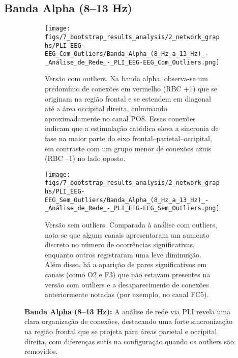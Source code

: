 \subsection{Banda Alpha (8–13 Hz)}
\begin{figure}[H]
    \centering
    \begin{subfigure}[b]{0.48\textwidth}
        \texttt{[image: figs/7\_bootstrap\_results\_analysis/2\_network\_graphs/PLI\_EEG-EEG\_Com\_Outliers/Banda\_Alpha\_(8\_Hz\_a\_13\_Hz)\_-\_Análise\_de\_Rede\_-\_PLI\_EEG-EEG\_Com\_Outliers.png]}
        \caption{\small Versão com outliers. Na banda alpha, observa-se um predomínio de conexões em vermelho (RBC +1) que se originam na região frontal e se estendem em diagonal até a área occipital direita, culminando aproximadamente no canal PO8. Essas conexões indicam que a estimulação catódica eleva a sincronia de fase na maior parte do eixo frontal–parietal–occipital, em contraste com um grupo menor de conexões azuis (RBC –1) no lado oposto.}
    \end{subfigure} 
    \hfill
    \begin{subfigure}[b]{0.48\textwidth}
        \texttt{[image: figs/7\_bootstrap\_results\_analysis/2\_network\_graphs/PLI\_EEG-EEG\_Sem\_Outliers/Banda\_Alpha\_(8\_Hz\_a\_13\_Hz)\_-\_Análise\_de\_Rede\_-\_PLI\_EEG-EEG\_Sem\_Outliers.png]}
        \caption{\small Versão sem outliers. Comparada à análise com outliers, nota-se que alguns canais apresentaram um aumento discreto no número de ocorrências significativas, enquanto outros registraram uma leve diminuição. Além disso, há a aparição de pares significativos em canais (como O2 e F3) que não estavam presentes na versão com outliers e a desaparecimento de conexões anteriormente notadas (por exemplo, no canal FC5).}
    \end{subfigure}
    \caption[Análise de Rede – Banda Alpha (PLI EEG–EEG)]{\small \textbf{Banda Alpha (8–13 Hz):} A análise de rede via PLI revela uma clara organização de conexões, destacando uma forte sincronização na região frontal que se projeta para áreas parietal e occipital direita, com diferenças sutis na configuração quando os outliers são removidos.}
    \label{fig:rede_alpha_pli}
\end{figure}

